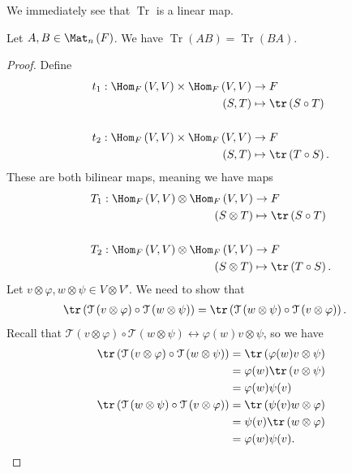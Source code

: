 \documentclass[10pt]{mypackage}
\DeclareMathOperator{\Tr}{Tr}
\begin{document}
  We immediately see that $\operatorname{Tr}$ is a linear map.
  \begin{corollary}
    Let $A,B\in \Mat_{n}\left(F\right)$. We have $\Tr\left(AB\right) = \Tr\left(BA\right)$.
  \end{corollary}
  \begin{proof}
    Define 
    \begin{align*}
      t_1: \Hom_{F}\left(V,V\right)\times \Hom_{F}\left(V,V\right) &\rightarrow F\\
      \left(S,T\right) &\mapsto \tr\left(S\circ T\right)\\
      \\
      t_{2}:\Hom_{F}\left(V,V\right)\times \Hom_{F}\left(V,V\right) &\rightarrow F\\
      \left(S,T\right) &\mapsto \tr\left(T\circ S\right).
    \end{align*}
    These are both bilinear maps, meaning we have maps
    \begin{align*}
      T_1: \Hom_{F}\left(V,V\right)\otimes \Hom_{F}\left(V,V\right) &\rightarrow F\\
      \left(S\otimes T\right) &\mapsto \tr\left(S\circ T\right)\\
      \\
      T_2: \Hom_{F}\left(V,V\right)\otimes \Hom_{F}\left(V,V\right) &\rightarrow F\\
      \left(S\otimes T\right) &\mapsto \tr\left(T\circ S\right).
    \end{align*}
    Let $v\otimes \varphi,w\otimes \psi\in V\otimes V'$. We need to show that
    \begin{align*}
      \tr\left(\mathcal{T}\left(v\otimes \varphi\right)\circ\mathcal{T}\left(w\otimes \psi\right)\right) &= \tr\left(\mathcal{T}\left(w\otimes \psi\right)\circ \mathcal{T}\left(v\otimes \varphi\right)\right).
    \end{align*}
    Recall that $\mathcal{T}\left(v\otimes \varphi\right)\circ \mathcal{T}\left(w\otimes \psi\right) \leftrightarrow \varphi(w)v\otimes \psi$, so we have
    \begin{align*}
      \tr\left(\mathcal{T}\left(v\otimes \varphi\right)\circ \mathcal{T}\left(w\otimes \psi\right)\right) &= \tr\left(\varphi(w) v\otimes \psi\right)\\
                                                                                                          &= \varphi(w)\tr\left(v\otimes \psi\right)\\
                                                                                                          &= \varphi(w)\psi(v)\\
      \tr\left(\mathcal{T}\left(w\otimes \psi\right)\circ \mathcal{T}\left(v\otimes \varphi\right)\right) &= \tr\left(\psi(v) w\otimes \varphi\right)\\
                                                                                                          &= \psi(v)\tr\left(w\otimes \varphi\right)\\
                                                                                                          &= \varphi(w)\psi(v).
    \end{align*}
  \end{proof}
\end{document}

